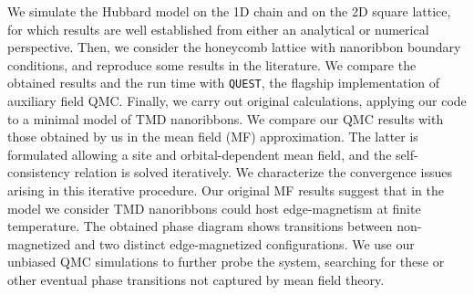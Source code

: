 
\label{cap:applications}

\slshape

We simulate the Hubbard model on the \acs{1D} chain and on the \acs{2D} square lattice, for which results are well established from either an analytical or numerical perspective.
Then, we consider the honeycomb lattice with  nanoribbon boundary conditions, and reproduce some results in the literature.
We compare the obtained results and the run time with \texttt{QUEST}, the flagship implementation of auxiliary field \acs{QMC}.
Finally, we carry out original calculations, applying our code to a minimal model of \acs{TMD} nanoribbons.
We compare our \acs{QMC} results with those obtained by us in the mean field (MF)  approximation.
The latter is formulated allowing a site and orbital-dependent mean field, and the self-consistency relation is solved iteratively.
We characterize the convergence issues arising in this iterative procedure.
Our original MF results suggest that in the model we consider \acs{TMD} nanoribbons could host edge-magnetism at finite temperature.
The obtained phase diagram shows transitions between non-magnetized and two distinct edge-magnetized configurations.
We use our unbiased \acs{QMC} simulations to further probe the system, searching for these or other eventual phase transitions not captured by mean field theory.

\normalfont




